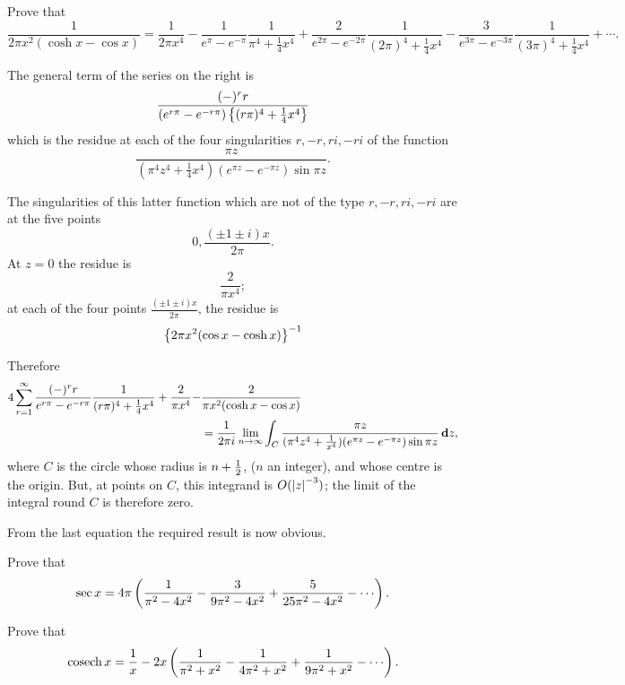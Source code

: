 \begin{wandwexample}
Prove that
$$
\frac{1}{2 \pi x^{2} (\cosh x - \cos x)}
=
\frac{1}{2 \pi x^{4}}
-
\frac{1}{e^{\pi}-e^{-\pi}}
\frac{1}{\pi^{4} + \frac{1}{4} x^{4}}
+
\frac{2}{e^{2 \pi}-e^{-2 \pi}}
\frac{1}{(2 \pi)^{4} + \frac{1}{4} x^{4}}
-
\frac{3}{e^{3 \pi}-e^{-3 \pi}}
\frac{1}{(3 \pi)^{4} + \frac{1}{4} x^{4}}
+
\cdots.
$$

The general term of the series on the right is
$$
\frac{(-)^{r} r}{(e^{r \pi}-e^{-r \pi})
  \left\{ (r \pi)^{4} + \frac{1}{4} x^{4} \right\}}
$$
which is the residue at each of the four singularities
$r, -r, ri, -ri$ of the function
$$
\frac{\pi z}{(\pi^{4}z^{4} + \frac{1}{4} x^{4}) (e^{\pi z} - e^{-\pi
    z}) \sin \pi z}.
$$

%
%

The singularities of this latter function which are not of the type
$r, -r, ri, -ri$ are at the five points
$$
0,
\frac{(\pm 1 \pm i) x}{2 \pi}.
$$
At $z=0$ the residue is
$$
\frac{2}{\pi x^{4}};
$$
at each of the four points
$\frac{(\pm 1 \pm i) x}{2 \pi}$, the residue is
$$
\left\{ 
  2 \pi x^{2} (\cos x - \cosh x)
 \right\}^{-1}
$$

Therefore
\begin{align*}
  4
  \sum_{r=1}^{\infty}
  \frac{(-)^{r} r}{e^{r\pi} - e^{-r\pi}}
  \frac{1}{(r\pi)^{4} + \frac{1}{4} x^{4}}
  +
  \frac{2}{\pi x^{4}}
  -&
  \frac{2}{ \pi x^{2} (\cosh x - \cos x)}
  \\
  &
  =
  \frac{1}{2 \pi i}
  \lim_{n \rightarrow \infty}
  \int_{C}
  \frac{\pi z}{
    (\pi^{4}z^{4} + \frac{1}{x^{4}})
    (e^{\pi z}-e^{-\pi z})
    \sin \pi z
  }
  \, \mathbf{d} z,
\end{align*}
where $C$ is the circle whose radius is $n + \frac{1}{2}$, ($n$ an integer),
and whose centre is the origin. But, at points on $C$, this integrand is
$O( \left| z \right|^{-3} )$; the limit of the integral round $C$ is
therefore zero.

From the last equation the required result is now obvious.
\end{wandwexample}
\begin{wandwexample}
  Prove that
  $$
  \sec x
  =
  4 \pi
  \theparen{
    \frac{1}{\pi^{2} - 4 x^{2}}
    -
    \frac{3}{9 \pi^{2} - 4 x^{2}}
    +
    \frac{5}{25 \pi^{2} - 4 x^{2}}
    -
    \cdots
  }.
  $$
\end{wandwexample}
\begin{wandwexample}
  Prove that
  $$
  \cosech x
  =
  \frac{1}{x}
  -
  2x
  \theparen{
    \frac{1}{\pi^{2} + x^{2}}
    -
    \frac{1}{4\pi^{2} + x^{2}}
    +
    \frac{1}{9 \pi^{2} + x^{2}}
    -
    \cdots
  }.
  $$
\end{wandwexample}
